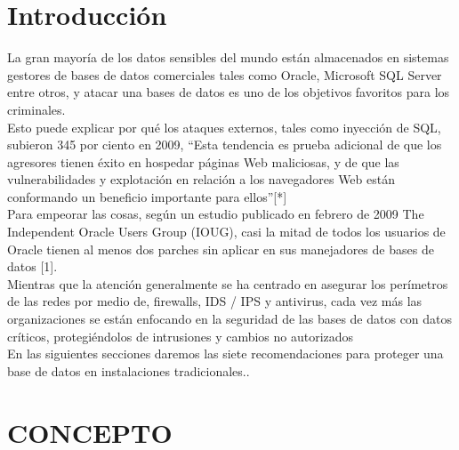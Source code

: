 \documentclass[conference]{IEEEtran}
\begin{document}
\section{Introducci\'on}
La gran mayoría de los datos sensibles del mundo están almacenados en sistemas gestores de bases de datos comerciales tales como Oracle, Microsoft SQL Server entre otros, y atacar una bases de datos es uno de los objetivos favoritos para los criminales.
\\
Esto puede explicar por qué los ataques externos, tales como inyección de SQL, subieron 345 por ciento en 2009, “Esta tendencia es prueba adicional de que los agresores tienen éxito en hospedar páginas Web maliciosas, y de que las vulnerabilidades y explotación en relación a los navegadores Web están conformando un beneficio importante para ellos”[*]
\\
Para empeorar las cosas, según un estudio publicado en febrero de 2009 The Independent Oracle Users Group (IOUG), casi la mitad de todos los usuarios de Oracle tienen al menos dos parches sin aplicar en sus manejadores de bases de datos [1].
\\
 Mientras que la atención generalmente se ha centrado en asegurar los perímetros de las redes por medio de, firewalls, IDS / IPS y antivirus, cada vez más las organizaciones se están enfocando en la seguridad de las bases de datos con datos críticos, protegiéndolos de intrusiones y cambios no autorizados
\\
En las siguientes secciones daremos las siete recomendaciones para proteger una base de datos en instalaciones tradicionales..
\\

\section{CONCEPTO}
\end{document}
